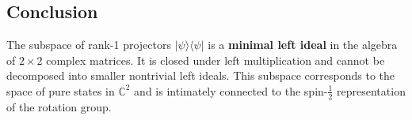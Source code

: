 \documentclass{article}
\begin{document}
\subsection*{Conclusion}

The subspace of rank-1 projectors $|\psi\rangle \langle \psi| $ is a \textbf{%
minimal left ideal} in the algebra of $2 \times 2 $ complex matrices. It is
closed under left multiplication and cannot be decomposed into smaller
nontrivial left ideals. This subspace corresponds to the space of pure
states in $\mathbb{C}^2 $ and is intimately connected to the spin-$\frac{1}{2%
} $ representation of the rotation group.
\end{document}
